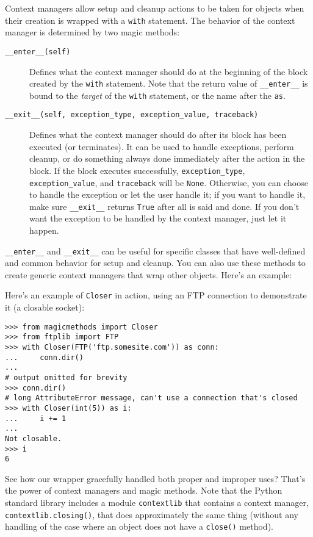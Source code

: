 \documentclass[a4paper,11pt]{article}
\newcommand{\code}[1]{\texttt{#1}}
\begin{document}
Context managers allow setup and cleanup actions to be taken for objects when their creation is wrapped with a \code{with} statement. The behavior of the context manager is determined by two magic methods:

\begin{description}

\item[\code{__enter__(self)}]
Defines what the context manager should do at the beginning of the block created by the \code{with} statement. Note that the return value of \code{__enter__} is bound to the \emph{target} of the \code{with} statement, or the name after the \code{as}.
\item[\code{__exit__(self, exception_type, exception_value, traceback)}]
Defines what the context manager should do after its block has been executed (or terminates). It can be used to handle exceptions, perform cleanup, or do something always done immediately after the action in the block. If the block executes successfully, \code{exception_type}, \code{exception_value}, and \code{traceback} will be \code{None}. Otherwise, you can choose to handle the exception or let the user handle it; if you want to handle it, make sure \code{__exit__} returns \code{True} after all is said and done. If you don't want the exception to be handled by the context manager, just let it happen.

\end{description}

\code{__enter__} and \code{__exit__} can be useful for specific classes that have well-defined and common behavior for setup and cleanup. You can also use these methods to create generic context managers that wrap other objects. Here's an example:



\noindent
Here's an example of \code{Closer} in action, using an FTP connection to demonstrate it (a closable socket):

\begin{lstlisting}
>>> from magicmethods import Closer
>>> from ftplib import FTP
>>> with Closer(FTP('ftp.somesite.com')) as conn:
...     conn.dir()
...
# output omitted for brevity
>>> conn.dir()
# long AttributeError message, can't use a connection that's closed
>>> with Closer(int(5)) as i:
...     i += 1
...
Not closable.
>>> i
6
\end{lstlisting}

\noindent
See how our wrapper gracefully handled both proper and improper uses? That's the power of context managers and magic methods. Note that the Python standard library includes a module \code{contextlib} that contains a context manager, \code{contextlib.closing()}, that does approximately the same thing (without any handling of the case where an object does not have a \code{close()} method).
\end{document}
